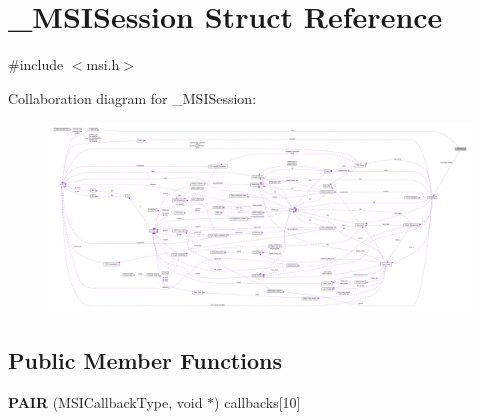 \hypertarget{struct___m_s_i_session}{\section{\+\_\+\+M\+S\+I\+Session Struct Reference}
\label{struct___m_s_i_session}
}


{\ttfamily \#include $<$msi.\+h$>$}



Collaboration diagram for \+\_\+\+M\+S\+I\+Session\+:\nopagebreak
\begin{figure}[H]
\begin{center}
\leavevmode
\includegraphics[width=350pt]{struct___m_s_i_session__coll__graph}
\end{center}
\end{figure}
\subsection*{Public Member Functions}
\begin{DoxyCompactItemize}
\item 
\hypertarget{struct___m_s_i_session_ad2cc3cf843c4b08a69f831cdad2eea1a}{{\bfseries P\+A\+I\+R} (M\+S\+I\+Callback\+Type, void $\ast$) callbacks\mbox{[}10\mbox{]}}\label{struct___m_s_i_session_ad2cc3cf843c4b08a69f831cdad2eea1a}

\end{DoxyCompactItemize}
